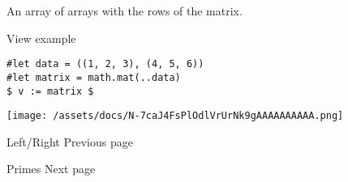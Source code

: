 An array of arrays with the rows of the matrix.


View example

\begin{verbatim}
#let data = ((1, 2, 3), (4, 5, 6))
#let matrix = math.mat(..data)
$ v := matrix $
\end{verbatim}

\texttt{[image: /assets/docs/N-7caJ4FsPlOdlVrUrNk9gAAAAAAAAAA.png]}

\href{/docs/reference/math/lr/}{\pandocbounded{}}

{ Left/Right } { Previous page }

\href{/docs/reference/math/primes/}{\pandocbounded{}}

{ Primes } { Next page }
